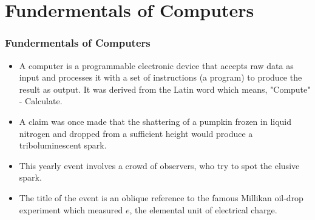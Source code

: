 \section{Fundermentals of Computers}

\begin{frame}
\frametitle{Fundermentals of Computers}
\begin{itemize}[<default overlay specification>]
	\item<1-> A computer is a programmable electronic device that accepts raw data as input and processes it with a set of instructions (a program) to produce the result as output. It was derived from the Latin word which means, "Compute" - Calculate.

    \item<1-> A claim was once made that the shattering of a pumpkin frozen in liquid nitrogen and dropped from a sufficient height would produce a triboluminescent spark. 
    
    \item<2-> This yearly event involves a crowd of observers, who try to spot the elusive spark.
    
    \item<3-> The title of the event is an oblique reference to the famous Millikan oil-drop experiment which measured $e$, the elemental unit of electrical charge.
\end{itemize}

\end{frame}